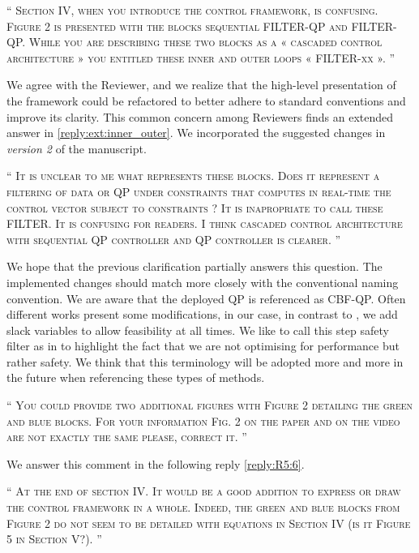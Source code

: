 \documentclass[10pt]{article}
\newcommand{\referee}[1]{\;
  \begin{minipage}[t]{.95\textwidth}
    ``{\small\color{red} \textsc{#1}}''
  \end{minipage}\medskip
  }
\newcommand{\version}[1]{\textit{version #1}}
\begin{document}
\begin{enumerate}[label={[R5:\,\arabic{enumi}]}]
\item\label{reply:R5:3} 
\referee{Section IV, when you introduce the control framework, is confusing. Figure 2 is presented with the blocks sequential FILTER-QP and FILTER-QP. While you are describing these two blocks as a «  cascaded control architecture »	 you entitled these inner and outer loops « FILTER-xx ». }

We agree with the Reviewer, and we realize that the high-level presentation of the framework could be refactored to better adhere to standard conventions and improve its clarity. This common concern among Reviewers finds an extended answer in \ref{reply:ext:inner_outer}. We incorporated the suggested changes in \version{2} of the manuscript.


\item\label{reply:R5:4} 
\referee{It is unclear to me what represents these blocks. Does it represent a filtering of data or QP under constraints that computes in real-time the control vector subject to constraints ? It is
inapropriate to call these FILTER. It is confusing for readers. I think cascaded control architecture with sequential QP controller and QP controller is clearer. 
}

We hope that the previous clarification partially answers this question. The implemented changes should match more closely with the conventional naming convention. We are aware that the deployed QP is referenced as CBF-QP. Often different works present some modifications, in our case, in contrast to \cite{ames2019control}, we add slack variables to allow feasibility at all times. We like to call this step safety filter as in \cite{wabersich2021predictive} to highlight the fact that we are not optimising for performance but rather safety. We think that this terminology will be adopted more and more in the future when referencing these types of methods.

\item\label{reply:R5:5} 
\referee{You could provide two additional figures with Figure 2 detailing the green and blue blocks. For your information Fig. 2 on the paper and on the video are not exactly the same please, correct it. }

We answer this comment in the following reply \ref{reply:R5:6}.

\item\label{reply:R5:6} 
\referee{At the end of section IV. It would be a good addition to express or draw the control framework in a whole. Indeed, the green and blue blocks from Figure 2 do not seem to be detailed with equations in Section IV (is it Figure 5 in Section V?). }


\end{enumerate}
\end{document}
